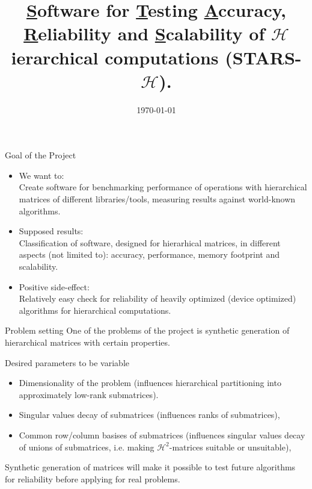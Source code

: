 \documentclass{beamer}
\title[STARS-$\mathcal{H}$]{\underline{S}oftware for \underline{T}esting
\underline{A}ccuracy, \underline{R}eliability and \underline{S}calability of
$\mathcal{H}$ierarchical computations (STARS-$\mathcal{H}$).}
\institute{King Abdullah University of Science and Technology}
\date{\today}
\begin{document}
\begin{frame}
\titlepage
\end{frame}

\begin{frame}{Goal of the Project}
\begin{itemize}
\item We want to:\\
Create software for benchmarking performance of operations with hierarchical
matrices of different libraries/tools, measuring results against world-known
algorithms.
\item Supposed results:\\
Classification of software, designed for hierarhical matrices, in different
aspects (not limited to): accuracy, performance, memory footprint and
scalability.
\item Positive side-effect:\\
Relatively easy check for reliability of heavily optimized (device optimized)
algorithms for hierarchical computations.
\end{itemize}
\end{frame}

\begin{frame}{Problem setting}
One of the problems of the project is synthetic generation of hierarchical
matrices with certain properties.
\begin{block}{Desired parameters to be variable}
\begin{itemize}
\item Dimensionality of the problem (influences hierarchical partitioning into
approximately low-rank submatrices).
\item Singular values decay of submatrices (influences ranks of submatrices),
\item Common row/column basises of submatrices (influences singular values
decay of unions of submatrices, i.e. making $\mathcal{H}^2$-matrices
suitable or unsuitable),
\end{itemize}
\end{block}
\begin{alertblock}{}
Synthetic generation of matrices will make it possible to test future
algorithms for reliability before applying for real problems.
\end{alertblock}
\end{frame}
\end{document}
